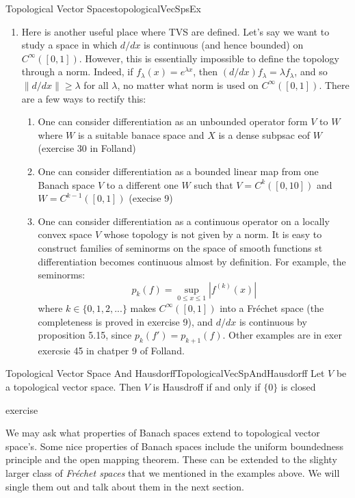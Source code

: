 \documentclass[oneside]{book}
\begin{document}
\begin{example}{Topological Vector Spaces}{topologicalVecSpsEx}
\begin{enumerate}
	\item Here is another useful place where TVS are defined. Let's say we want to study a space in which $d/dx$ is
		continuous (and hence bounded) on $C^\infty([0,1])$. However, this is essentially impossible to define the
		topology through a norm. Indeed, if $f_\lambda(x) = e^{\lambda x}$, then $(d/dx)f_\lambda = \lambda f_\lambda$,
		and so $\|d/dx\| \ge \lambda$ for all $\lambda$, no matter what norm is used on $C^{\infty}([0,1])$. There are
		a few ways to rectify this:
		\begin{enumerate}
			\item One can consider differentiation as an unbounded operator form $V$ to $W$ where $W$ is a suitable
				banace space and $X$ is a dense subpsac eof $W$ (exercise 30 in Folland)
			\item One can consider differentiation as a bounded linear map from one Banach space $V$ to a different one
				$W$ such that $V = C^{k}([0,10])$ and $W = C^{k-1}([0,1])$ (execise 9)
			\item One can consider differentiation as a continuous operator on a locally convex space $V$ whose topology
				is not given by a norm. It is easy to construct families of seminorms on the space of smooth functions
				st differentiation becomes continuous almost by definition. For example, the seminorms:
				\[
					p_k(f) = \sup_{0 \le x \le 1}|f^{(k)}(x)|
				\]
				where $k \in \{0,1,2,...\}$ makes $C^\infty([0,1])$ into a Fr\'echet space (the completeness is
				proved in exercise 9), and $d/dx$ is continuous by proposition 5.15, since $p_k(f') = p_{k+1}(f)$. Other
				examples are in exer exercsie 45 in chatper 9 of Folland.
		\end{enumerate}
	\end{enumerate}
\end{example}


\begin{prop}{ Topological Vector Space And Hausdorff}{TopologicalVecSpAndHausdorff}
	Let $V$ be a topological vector space. Then $V$ is Hausdroff if and only if $\{0\}$ is closed
\end{prop}

\begin{Proof}
	exercise
\end{Proof}

We may ask what properties of Banach spaces extend to topological vector space's. Some nice properties of
Banach spaces include the uniform boundedness principle and the open mapping theorem. These can be extended to the
slighty larger class of \emph{Fr\'echet spaces} that we mentioned in the examples above. We will single them
out and talk about them in the next section.
\end{document}
